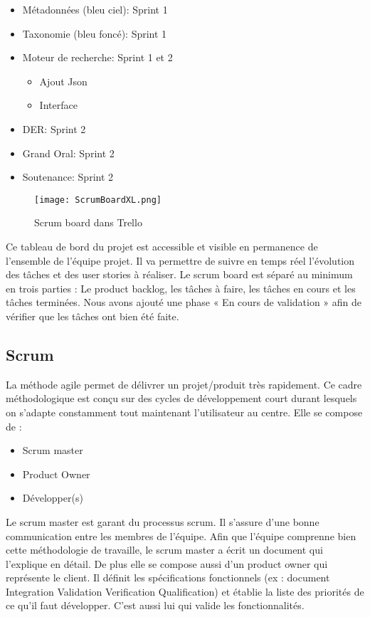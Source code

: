 \begin{itemize}
    \item Métadonnées (bleu ciel): Sprint 1 
    \item Taxonomie (bleu foncé): Sprint 1 
    \item Moteur de recherche: Sprint 1 et 2 
        \begin{itemize}
            \item Ajout Json
            \item Interface
        \end{itemize}
    \item DER: Sprint 2
    \item Grand Oral: Sprint 2  
    \item Soutenance: Sprint 2 
\end{itemize}


\begin{figure}[h!]
  \centering
  \texttt{[image: ScrumBoardXL.png]}
	\caption[]{Scrum board dans Trello}
	\label{}
\end{figure}

Ce tableau de bord du projet est accessible et visible en permanence de l’ensemble de l’équipe projet. Il va permettre de suivre en temps réel l’évolution des tâches et des user stories à réaliser. Le scrum board est séparé au minimum en trois parties : Le product backlog, les tâches à faire, les tâches en cours et les tâches terminées.
Nous avons ajouté une phase « En cours de validation » afin de vérifier que les tâches ont bien été faite. 


\subsection{Scrum}
La méthode agile permet de délivrer un projet/produit très rapidement. Ce cadre méthodologique est conçu sur des cycles de développement court durant lesquels on s’adapte constamment tout maintenant l’utilisateur au centre. 
Elle se compose de :

\begin{itemize}
    \item Scrum master 
    \item Product Owner 
    \item Développer(s) 
\end{itemize}

Le scrum master est garant du processus scrum. Il s’assure d’une bonne communication entre les membres de l’équipe. Afin que l’équipe comprenne bien cette méthodologie de travaille, le scrum master a écrit un document qui l’explique en détail.
De plus elle se compose aussi d’un product owner qui représente le client. Il définit les spécifications fonctionnels (ex :  document Integration Validation Verification Qualification) et établie la liste des priorités de ce qu’il faut développer. C’est aussi lui qui valide les fonctionnalités.



